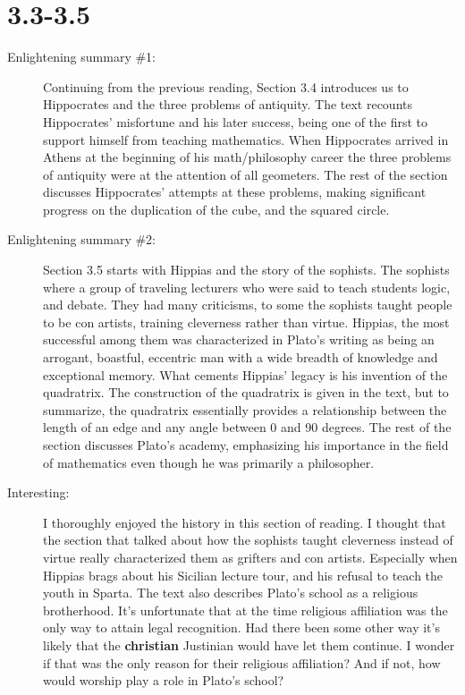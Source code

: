 \documentclass[12pt]{article}
\theoremstyle{homework}
\begin{document}
\section*{3.3-3.5}

\begin{description}
\item[Enlightening summary \#1:] Continuing from the previous reading, Section 3.4 introduces us to 
Hippocrates and the three problems of antiquity. The text recounts Hippocrates' misfortune and his later success,
being one of the first to support himself from teaching mathematics. When Hippocrates arrived in Athens at the beginning of his 
math/philosophy career the three problems of antiquity were at the attention of all geometers. The rest of the section discusses Hippocrates' attempts at these problems, 
making significant progress on the duplication of the cube, and the squared circle. 
 
\item[Enlightening summary \#2:] Section 3.5 starts with Hippias and the story of the sophists. The sophists where a group of traveling lecturers who were said to teach 
students logic, and debate. They had many criticisms, to some the sophists taught people to be con artists, training cleverness rather than virtue. Hippias, the most successful
among them was characterized in Plato's writing as being an arrogant, boastful, eccentric man with a wide breadth of knowledge and exceptional memory. What cements Hippias' legacy is his
invention of the quadratrix. The construction of the quadratrix is given in the text, but to summarize, the quadratrix essentially provides a relationship between the length of an edge and any angle between 0 and 90 degrees. 
The rest of the section discusses Plato's academy, emphasizing his importance in the field of mathematics even though he was primarily a philosopher. 

\item[Interesting:] I thoroughly enjoyed the history in this section of reading. I thought that the section that talked about how the sophists taught cleverness instead of virtue
really characterized them as grifters and con artists. Especially when Hippias brags about his Sicilian lecture tour, and his refusal to teach the youth in Sparta. The text also describes
Plato's school as a religious brotherhood. It's unfortunate that at the time religious affiliation was the only way to attain legal recognition. Had there been some other way it's likely that the \textbf{christian} Justinian 
would have let them continue. I wonder if that was the only reason for their religious affiliation? And if not, how would worship play a role in Plato's school? 
 


\end{description}
\end{document}
